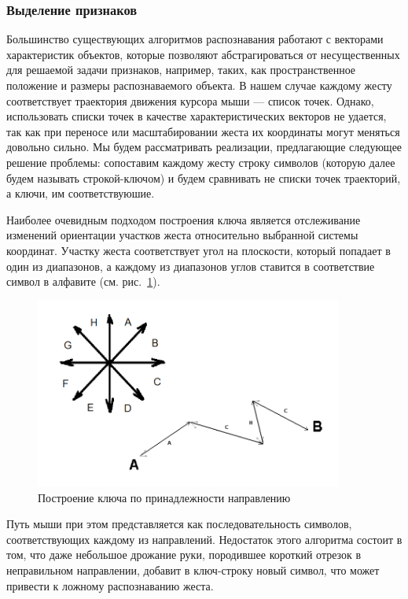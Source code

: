 \documentclass[a5paper]{article}
\begin{document}
\subsubsection{Выделение признаков}
Большинство существующих алгоритмов распознавания работают с векторами характеристик объектов, которые позволяют абстрагироваться от несущественных для решаемой задачи признаков, например, таких, как пространственное положение и размеры распознаваемого объекта. В нашем случае каждому жесту соответствует траектория движения курсора мыши --- список точек. Однако, использовать списки точек в качестве характеристических векторов не удается, так как при переносе или масштабировании жеста их координаты могут меняться довольно сильно. Мы будем рассматривать реализации, предлагающие следующее решение проблемы: сопоставим каждому жесту строку символов (которую далее будем называть строкой-ключом) и будем сравнивать не списки точек траекторий, а ключи, им соответствуюшие.

Наиболее очевидным подходом построения ключа является отслеживание изменений ориентации участков жеста относительно выбранной системы координат. Участку жеста соответствует угол на плоскости, который попадает в один из диапазонов, а каждому из диапазонов углов ставится в соответствие символ в алфавите (см. рис.~\ref{chaos}). 

\begin{figure} [ht]
  \begin{center}
    \includegraphics[width=0.9\textwidth, bb=0 0 804 498]{02-chaos.png}
    \caption{Построение ключа по принадлежности направлению}
    \label{chaos}
  \end{center}
\end{figure}

Путь мыши при этом представляется как последовательность символов, соответствующих каждому из направлений. Недостаток этого алгоритма состоит 
в том, что даже небольшое дрожание руки, породившее короткий отрезок в неправильном направлении, добавит в ключ-строку новый символ, что
может привести к ложному распознаванию жеста.
\end{document}
